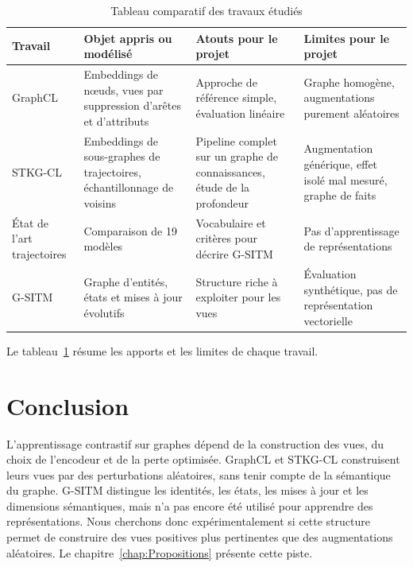 \documentclass[11pt, french, screen, research-development]{report-rd-info}
\begin{document}
\begin{table}
   \begin{center}
      \small
      \begin{tabular}{|p{2.6cm}|p{3.4cm}|p{3.8cm}|p{3.8cm}|}
         \hline
         Travail & Objet appris ou modélisé & Atouts pour le projet & Limites pour le projet \\
         \hline
         \hline
         GraphCL \cite{hafidi2020graphcl} & Embeddings de nœuds, vues par suppression d'arêtes et d'attributs & Approche de référence simple, évaluation linéaire & Graphe homogène, augmentations purement aléatoires \\
         \hline
         STKG-CL \cite{chen2025stkgplm} & Embeddings de sous-graphes de trajectoires, échantillonnage de voisins & Pipeline complet sur un graphe de connaissances, étude de la profondeur & Augmentation générique, effet isolé mal mesuré, graphe de faits \\
         \hline
         État de l'art trajectoires \cite{siouane2026survey} & Comparaison de 19 modèles & Vocabulaire et critères pour décrire G-SITM & Pas d'apprentissage de représentations \\
         \hline
         G-SITM \cite{siouane2026gsitm} & Graphe d'entités, états et mises à jour évolutifs & Structure riche à exploiter pour les vues & Évaluation synthétique, pas de représentation vectorielle \\
         \hline
      \end{tabular}
   \end{center}
   \caption{Tableau comparatif des travaux étudiés}
   \label{tab:Comparatif}
\end{table}

Le tableau~\ref{tab:Comparatif} résume les apports et les limites de chaque travail.

\section{Conclusion}

 L'apprentissage contrastif sur graphes dépend de la construction des vues, du choix de l'encodeur
et de la perte optimisée. GraphCL et STKG-CL construisent leurs vues par des perturbations
aléatoires, sans tenir compte de la sémantique du graphe. G-SITM distingue les identités, les états,
les mises à jour et les dimensions sémantiques, mais n'a pas encore été utilisé pour apprendre des
représentations. Nous cherchons donc expérimentalement si cette structure permet de construire des
vues positives plus pertinentes que des augmentations aléatoires. Le
chapitre~\ref{chap:Propositions} présente cette piste.
\end{document}
